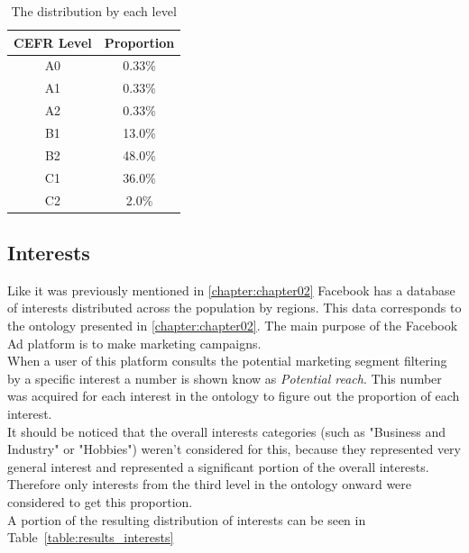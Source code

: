 \begin{table}[]
    \centering
    \begin{tabular}{cc}
    \hline
    CEFR Level & Proportion \\
    \hline
    A0         & 0.33\%     \\
    A1         & 0.33\%     \\
    A2         & 0.33\%     \\
    B1         & 13.0\%     \\
    B2         & 48.0\%     \\
    C1         & 36.0\%     \\
    C2         & 2.0\%      \\
    \hline
    \end{tabular}
    \caption{The distribution by each level}
    \label{table:results_levels}
\end{table}

\subsection{Interests} 

Like it was previously mentioned in \ref{chapter:chapter02} Facebook has a database of interests distributed across the population by regions. This data corresponds to the ontology presented in \ref{chapter:chapter02}. The main purpose of the Facebook Ad platform \cite{facebook_business} is to make marketing campaigns.\\

When a user of this platform consults the potential marketing segment filtering by a specific interest a number is shown know as \textit{Potential reach}. This number was acquired for each interest in the ontology to figure out the proportion of each interest.\\

It should be noticed that the overall interests categories (such as "Business and Industry" or "Hobbies") weren't considered for this, because they represented very general interest and represented a significant portion of the overall interests. Therefore only interests from the third level in the ontology onward were considered to get this proportion.\\

A portion of the resulting distribution of interests can be seen in Table~\ref{table:results_interests}

